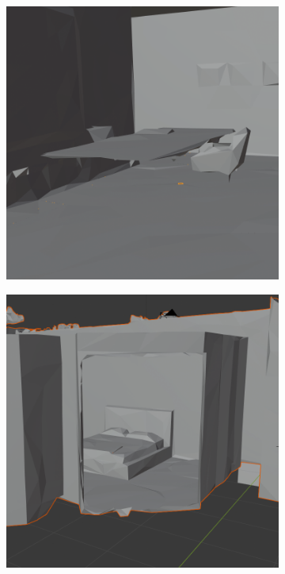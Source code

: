 \begin{figure}[h!]
	\centering
	\begin{subfigure}[b]{0.32\linewidth}
		\centering
		\includegraphics[width=\textwidth]{images/table.png}
		\caption{}
		\label{fig:matterport_issues_meshes_furniture}
	\end{subfigure}
	\hfil
	\begin{subfigure}[b]{0.32\linewidth}
		\centering
		\includegraphics[width=\textwidth]{images/holes.png}

\end{subfigure}
\end{figure}
